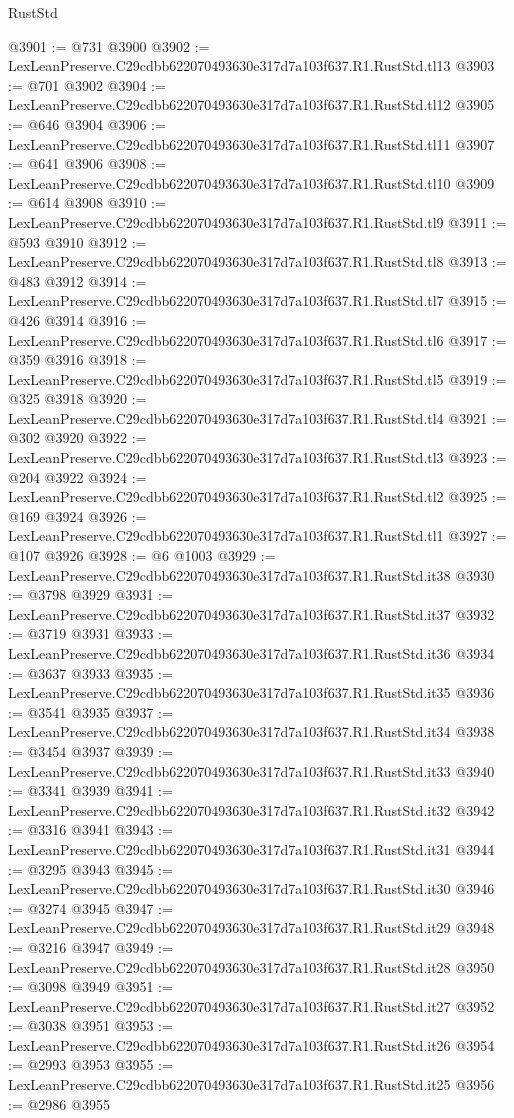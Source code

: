 \begin{lexlean}{RustStd}
\begin{coremodule}
@3901 := @731 @3900
@3902 := LexLeanPreserve.C29cdbb622070493630e317d7a103f637.R1.RustStd.tl13
@3903 := @701 @3902
@3904 := LexLeanPreserve.C29cdbb622070493630e317d7a103f637.R1.RustStd.tl12
@3905 := @646 @3904
@3906 := LexLeanPreserve.C29cdbb622070493630e317d7a103f637.R1.RustStd.tl11
@3907 := @641 @3906
@3908 := LexLeanPreserve.C29cdbb622070493630e317d7a103f637.R1.RustStd.tl10
@3909 := @614 @3908
@3910 := LexLeanPreserve.C29cdbb622070493630e317d7a103f637.R1.RustStd.tl9
@3911 := @593 @3910
@3912 := LexLeanPreserve.C29cdbb622070493630e317d7a103f637.R1.RustStd.tl8
@3913 := @483 @3912
@3914 := LexLeanPreserve.C29cdbb622070493630e317d7a103f637.R1.RustStd.tl7
@3915 := @426 @3914
@3916 := LexLeanPreserve.C29cdbb622070493630e317d7a103f637.R1.RustStd.tl6
@3917 := @359 @3916
@3918 := LexLeanPreserve.C29cdbb622070493630e317d7a103f637.R1.RustStd.tl5
@3919 := @325 @3918
@3920 := LexLeanPreserve.C29cdbb622070493630e317d7a103f637.R1.RustStd.tl4
@3921 := @302 @3920
@3922 := LexLeanPreserve.C29cdbb622070493630e317d7a103f637.R1.RustStd.tl3
@3923 := @204 @3922
@3924 := LexLeanPreserve.C29cdbb622070493630e317d7a103f637.R1.RustStd.tl2
@3925 := @169 @3924
@3926 := LexLeanPreserve.C29cdbb622070493630e317d7a103f637.R1.RustStd.tl1
@3927 := @107 @3926
@3928 := @6 @1003
@3929 := LexLeanPreserve.C29cdbb622070493630e317d7a103f637.R1.RustStd.it38
@3930 := @3798 @3929
@3931 := LexLeanPreserve.C29cdbb622070493630e317d7a103f637.R1.RustStd.it37
@3932 := @3719 @3931
@3933 := LexLeanPreserve.C29cdbb622070493630e317d7a103f637.R1.RustStd.it36
@3934 := @3637 @3933
@3935 := LexLeanPreserve.C29cdbb622070493630e317d7a103f637.R1.RustStd.it35
@3936 := @3541 @3935
@3937 := LexLeanPreserve.C29cdbb622070493630e317d7a103f637.R1.RustStd.it34
@3938 := @3454 @3937
@3939 := LexLeanPreserve.C29cdbb622070493630e317d7a103f637.R1.RustStd.it33
@3940 := @3341 @3939
@3941 := LexLeanPreserve.C29cdbb622070493630e317d7a103f637.R1.RustStd.it32
@3942 := @3316 @3941
@3943 := LexLeanPreserve.C29cdbb622070493630e317d7a103f637.R1.RustStd.it31
@3944 := @3295 @3943
@3945 := LexLeanPreserve.C29cdbb622070493630e317d7a103f637.R1.RustStd.it30
@3946 := @3274 @3945
@3947 := LexLeanPreserve.C29cdbb622070493630e317d7a103f637.R1.RustStd.it29
@3948 := @3216 @3947
@3949 := LexLeanPreserve.C29cdbb622070493630e317d7a103f637.R1.RustStd.it28
@3950 := @3098 @3949
@3951 := LexLeanPreserve.C29cdbb622070493630e317d7a103f637.R1.RustStd.it27
@3952 := @3038 @3951
@3953 := LexLeanPreserve.C29cdbb622070493630e317d7a103f637.R1.RustStd.it26
@3954 := @2993 @3953
@3955 := LexLeanPreserve.C29cdbb622070493630e317d7a103f637.R1.RustStd.it25
@3956 := @2986 @3955

\end{coremodule}
\end{lexlean}
